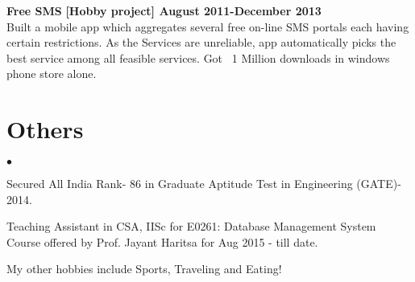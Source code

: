 \documentclass[margin,line]{res}
\newenvironment{list2}{
  \begin{list}{$\bullet$}{%
      \setlength{\itemsep}{0in}
      \setlength{\parsep}{0in} \setlength{\parskip}{0in}
      \setlength{\topsep}{0in} \setlength{\partopsep}{0in} 
      \setlength{\leftmargin}{0.2in}}}{\end{list}}
\begin{document}
\begin{resume}
{\bf Free SMS}
\hfill {\bf  [Hobby project] August 2011-December 2013}\\
Built a mobile app which aggregates several free on-line SMS portals each having certain restrictions. As the Services are unreliable, app automatically picks the best service among all feasible services. Got ~1 Million downloads in windows phone store alone.

\section{\sc Others} 
\begin{list2}
\item Secured All India Rank- 86 in Graduate Aptitude Test in Engineering (GATE)- 2014.
\item Teaching Assistant in CSA, IISc for E0261: Database Management System Course offered by Prof. Jayant Haritsa for Aug 2015 - till date.
\item My other hobbies include Sports, Traveling and Eating!
\end{list2}


\end{resume}
\end{document}
